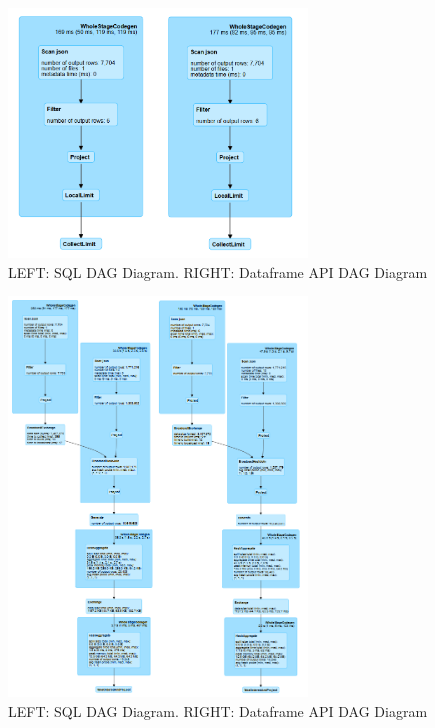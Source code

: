 \documentclass[]{article}
\begin{document}
\begin{figure}[h]

{\centering \includegraphics[width=300px]{images/query4} 

}

\caption{\label{fig:figs}LEFT: SQL DAG Diagram. RIGHT: Dataframe API DAG Diagram}\label{fig:unnamed-chunk-9}
\end{figure}

\begin{figure}[h]

{\centering \includegraphics[width=300px]{images/query5} 

}

\caption{\label{fig:figs}LEFT: SQL DAG Diagram. RIGHT: Dataframe API DAG Diagram}\label{fig:unnamed-chunk-10}
\end{figure}
\end{document}

